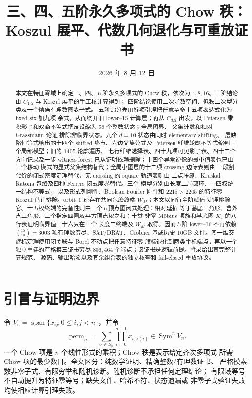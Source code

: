 \documentclass[10pt,a4paper,reqno]{amsart}
\title[三、四、五阶永久多项式的 Chow 秩]
{三、四、五阶永久多项式的 Chow 秩：\\
 Koszul 展平、代数几何退化与可重放证书}
\author{}
\date{2026 年 8 月 12 日}
\theoremstyle{definition}
\newcommand{\Sym}{\operatorname{Sym}}
\newcommand{\Span}{\operatorname{span}}
\newcommand{\perm}{\operatorname{perm}}
\begin{document}
\begin{abstract}
本文在特征零域上确定三、四、五阶永久多项式的 Chow 秩，依次为
\(4,8,16\)。三阶结论由 \(C_{1,2}\) 与 Koszul 展平的手工核计算得到；
四阶结论使用二次导数空间、低秩二次型分类及一个精确有理数图表子式。
五阶部分先用拆项引理把任意至多十五项表达式化为 fixed-six 加九项
余式，从而绕开旧 lower--15 计算层；再从 \(C_{3,2}\) 出发，以
Petersen 乘积影子和双商不等式把反设缩为 58 个整数状态；全局图界、
父集计数和相对 Grassmann 论证
排除非临界状态。九个 \(d=10\) 状态由同时 elementary shifting、
层缺陷恒等式给出的十四个 shifted 终点、六边父集公式及
Petersen 纤维轮廓不等式缩到三个局部模型；旧的 \(1405\) 轮廓遍历、
七行纤维选择表、四十九项可见影子表、四十二个方向记录及一步 witness
forest 已从证明依赖删除；十四个异常逆像的最小值表也已由三个移动
模式的显式父集结构替代；全局小图层的十二项 crossing 边际表则由
三段割代价的闭式密度定理替代，无 crossing 的 square 轨道表则由
二点压缩、Kruskal--Katona 包络及四种 Ferrers 闭式度界替代。三个
模型分别由长度二局部环、十四权统一结构不等式，
以及形式列刚性、Boolean Fourier 刚性和 \(2215>2205\) 的特征零 Koszul
估计排除。orbit--1 还存在共同包络终端 \(W_M\)；本文以同行全阶赋值
定理排除它。十五权终端的完备性则由一个五顶点图闭式处理：相对延拓
等于基底三角形、含外点三角形、三个指定四圈及平方顶点权之和；十类
非零 Möbius 项族和基底图 \(K_4\) 的八行表证明临界值三十六只在三个
长度二终端及 \(W_M\) 取得。因而五阶 lower--16 不再依赖
\(\binom{15}{10}=3003\) 项有理数穷尽、SAT/DRAT、Gröbner 基或历史
10GB 文件。其一维交旗标定理使用闭关联与 Borel 不动点把任意特征零
旗标退化到两类坐标端点，再以一个独立重建的严格模三证书穷尽
\(886{,}464\) 个端点；该证书是逻辑前提。附录给出其完整计算规范、
源码、输出哈希以及其余组合表的独立核查和 fail-closed 重放协议。
\end{abstract}
\maketitle

\section{引言与证明边界}

令 \(V_n=\Span\{x_{ij}:0\le i,j<n\}\)，并令
\[
 \perm_n=\sum_{\sigma\in S_n}\prod_{i=0}^{n-1}x_{i,\sigma(i)}
 \in\Sym^nV_n.
\]
一个 Chow 项是 \(n\) 个线性形式的乘积；Chow 秩是表示给定齐次多项式
所需 Chow 项的最少数目。全文区分：纯数学证明、精确整数/有理数证书、
严格模素数非零子式、有限穷举和随机诊断。随机诊断不承担任何定理结论；
有限域等号不自动提升为特征零等号；缺失文件、哈希不符、状态遗漏或
非零子式验证失败均使相应计算引理失败。
\end{document}
